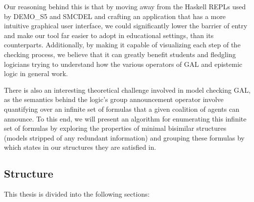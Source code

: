 Our reasoning behind this is that by moving away from the Haskell REPLs used by DEMO\_S5 and SMCDEL and crafting an application that has a more intuitive graphical user interface, we could significantly lower the barrier of entry and make our tool far easier to adopt in educational settings, than its counterparts. Additionally, by making it capable of visualizing each step of the checking process, we believe that it can greatly benefit students and fledgling logicians trying to understand how the various operators of GAL and epistemic logic in general work. 

There is also an interesting theoretical challenge involved in model checking GAL, as the semantics behind the logic's group announcement operator involve quantifying over an infinite set of formulas that a given coalition of agents can announce. To this end, we will present an algorithm for enumerating this infinite set of formulas by exploring the properties of minimal bisimilar structures (models stripped of any redundant information) and grouping these formulas by which states in our structures they are satisfied in. 




\subsection{Structure}

This thesis is divided into the following sections: 

